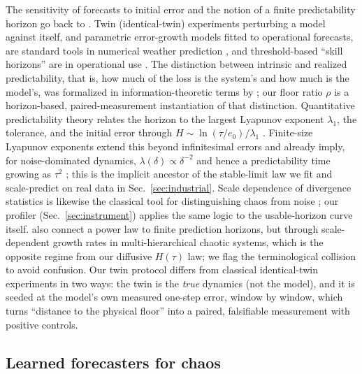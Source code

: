 \documentclass[aps,pre,twocolumn,superscriptaddress,nofootinbib,longbibliography]{revtex4-2}
\begin{document}
The sensitivity of forecasts to initial error and the notion of a finite
predictability horizon go back to
\citet{lorenz1963deterministic,lorenz1965predictability,lorenz1969predictability}.
Twin (identical-twin) experiments perturbing a model against itself, and
parametric error-growth models fitted to operational forecasts, are
standard tools in numerical weather prediction
\citep{lorenz1982atmospheric,dalcher1987error,palmer2000predicting}, and
threshold-based ``skill horizons'' are in operational use
\citep{buizza2015forecast}. The distinction between intrinsic and realized
predictability, that is, how much of the loss is the system's and how much
is the model's, was formalized in information-theoretic terms by
\citet{delsole2007predictability}; our floor ratio $\rho$ is a
horizon-based, paired-measurement instantiation of that distinction.
Quantitative predictability theory relates the horizon to the largest
Lyapunov exponent $\lambda_1$, the tolerance, and the initial error
through $H \sim \ln(\tau/e_0)/\lambda_1$ \citep{boffetta2002predictability}.
Finite-size Lyapunov exponents extend this beyond infinitesimal errors and
already imply, for noise-dominated dynamics,
$\lambda(\delta) \propto \delta^{-2}$ and hence a predictability time
growing as $\tau^2$ \citep{aurell1997predictability}; this is the implicit
ancestor of the stable-limit law we fit and scale-predict on real data in
Sec.~\ref{sec:industrial}. Scale dependence of divergence statistics is
likewise the classical tool for distinguishing chaos from noise
\citep{cencini2000chaos,gao2006distinguishing}; our profiler
(Sec.~\ref{sec:instrument}) applies the same logic to the usable-horizon
curve itself. \citet{brisch2019power} also connect a power law to finite
prediction horizons, but through scale-dependent growth rates in
multi-hierarchical chaotic systems, which is the opposite regime from our
diffusive $H(\tau)$ law; we flag the terminological collision to avoid
confusion. Our twin protocol differs from classical identical-twin
experiments in two ways: the twin is the \emph{true} dynamics (not the
model), and it is seeded at the model's own measured one-step error,
window by window, which turns ``distance to the physical floor'' into a
paired, falsifiable measurement with positive controls.

\subsection{Learned forecasters for chaos}
\end{document}
